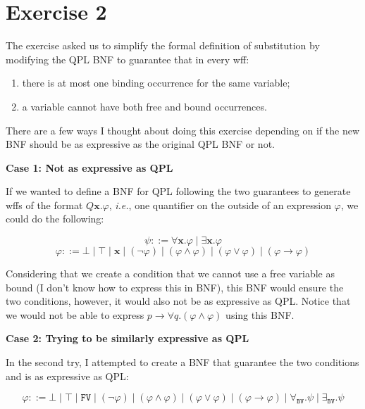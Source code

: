 \documentclass[11pt]{article}
\begin{document}
\section*{Exercise 2}
The exercise asked us to simplify the formal definition of substitution by modifying the QPL BNF to guarantee that in every wff:

\begin{enumerate}
    \item there is at most one binding occurrence for the same variable;
    \item a variable cannot have both free and bound occurrences.
\end{enumerate}

There are a few ways I thought about doing this exercise depending on if the new BNF should be as expressive as the original QPL BNF or not.

\vspace{0.2cm}
\textbf{Case 1: Not as expressive as QPL}
\vspace{0.2cm}

If we wanted to define a BNF for QPL following the two guarantees to generate wffs of the format $Q\boldsymbol{x}. \varphi$, \emph{i.e.}, one quantifier on the outside of an expression $\varphi$, we could do the following:

$$\psi ::= \forall\boldsymbol{x}. \varphi \mid \exists\boldsymbol{x}. \varphi  $$
$$\varphi ::= \bot \mid \top \mid \boldsymbol{x} \mid (\lnot \varphi) \mid (\varphi \land \varphi) \mid (\varphi \lor \varphi) \mid (\varphi \to \varphi)$$

Considering that we create a condition that we cannot use a free variable as bound (I don't know how to express this in BNF), this BNF would ensure the two conditions, however, it would also not be as expressive as QPL. Notice that we would not be able to express $p \to \forall q. (\varphi \land \varphi)$ using this BNF.

\vspace{0.2cm}
\textbf{Case 2: Trying to be similarly expressive as QPL}
\vspace{0.2cm}

In the second try, I attempted to create a BNF that guarantee the two conditions and is as expressive as QPL:

$$\varphi ::= \bot \mid \top \mid \texttt{FV} \mid (\lnot \varphi) \mid (\varphi \land \varphi) \mid (\varphi \lor \varphi) \mid (\varphi \to \varphi) \mid \forall_{\texttt{BV}}. \psi \mid \exists_{\texttt{BV}}. \psi$$
\end{document}
